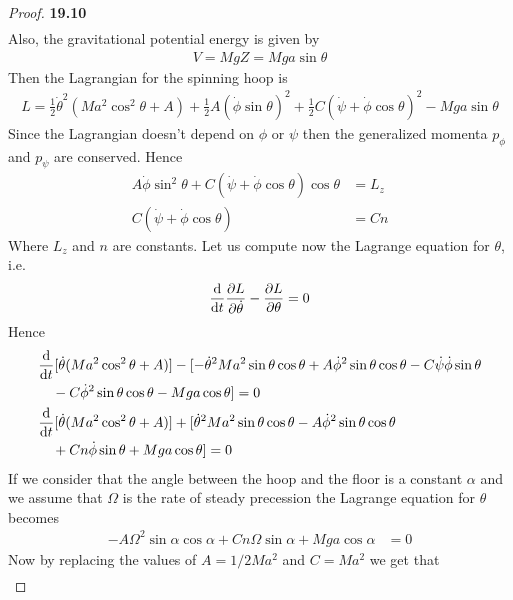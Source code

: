 \documentclass[11pt]{article}
\theoremstyle{definition}
\begin{document}
\begin{proof}{\textbf{19.10}}
\begin{align*}
    \end{align*}
    Also, the gravitational potential energy is given by
    \begin{align*}
        V = MgZ = Mga\sin\theta
    \end{align*}
    Then the Lagrangian for the spinning hoop is
    \begin{align*}
        L =  \frac{1}{2}\dot\theta^2 (Ma^2\cos^2\theta + A)
        + \frac{1}{2}A(\dot\phi\sin\theta)^2
        + \frac{1}{2}C(\dot\psi + \dot\phi\cos\theta)^2 - Mga\sin\theta
    \end{align*}
    Since the Lagrangian doesn't depend on $\phi$ or $\psi$
    then the generalized momenta $p_\phi$ and $p_\psi$ are conserved. Hence
    \begin{align*}
        A\dot\phi\sin^2\theta + C(\dot\psi + \dot\phi\cos\theta)\cos\theta
        &= L_z\\
        C(\dot\psi + \dot\phi\cos\theta) &= Cn
    \end{align*}
    Where $L_z$ and $n$ are constants.
    Let us compute now the Lagrange equation for $\theta$, i.e.
    \begin{align*}
        \derivative{}{t}\partialderivative{L}{\dot\theta}
        - \partialderivative{L}{\theta} = 0
    \end{align*}
    Hence
    \begin{align*}
        &\derivative{}{t}[\dot\theta(Ma^2\cos^2\theta + A)]
        - [-\dot\theta^2 Ma^2\sin\theta\cos\theta
        + A\dot\phi^2\sin\theta\cos\theta
        - C\dot\psi\dot\phi\sin\theta\\
        &\quad - C\dot\phi^2\sin\theta\cos\theta - Mga\cos\theta] = 0\\
        &\derivative{}{t}[\dot\theta(Ma^2\cos^2\theta + A)]
        + [\dot\theta^2 Ma^2\sin\theta\cos\theta
        - A\dot\phi^2\sin\theta\cos\theta\\
        &\quad+ Cn\dot\phi\sin\theta + Mga\cos\theta] = 0
    \end{align*}
    If we consider that the angle between the hoop and the floor is a constant
    $\alpha$ and we assume that $\Omega$ is the rate of steady precession
    the Lagrange equation for $\theta$ becomes
    \begin{align*}
        -A\Omega^2\sin\alpha\cos\alpha + Cn\Omega\sin\alpha + Mga\cos\alpha &= 0        
    \end{align*}
    Now by replacing the values of $A = 1/2Ma^2$ and $C = Ma^2$ we get that
    \begin{align*}

\end{align*}
\end{proof}
\end{document}
